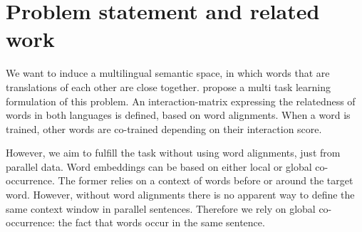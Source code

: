 \documentclass[a4paper,11pt]{article}
\begin{document}






\section*{Problem statement and related work}



We want to induce a multilingual semantic space, in which words that are translations of each other are close together. 
\cite{klementiev2012inducing} propose a multi task learning formulation of this problem. An interaction-matrix expressing the relatedness of words in both languages is defined, based on word alignments. When a word is trained, other words are co-trained depending on their interaction score.

However, we aim to fulfill the task without using word alignments, just from parallel data. Word embeddings can be based on either local or global co-occurrence. The former relies on a context of words before or around the target word. However, without word alignments there is no apparent way to define the same context window in parallel sentences. Therefore we rely on global co-occurrence: the fact that words occur in the same sentence. 

\end{document}
